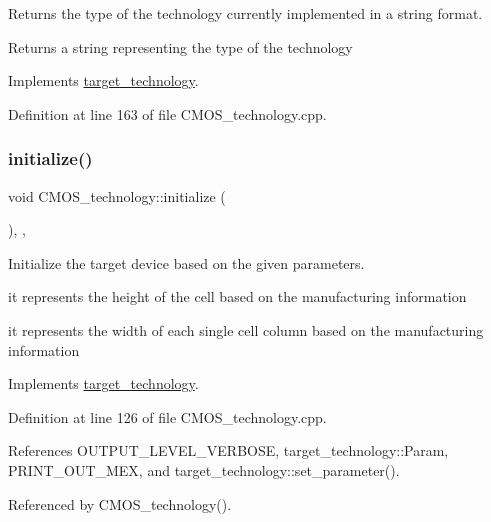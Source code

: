 Returns the type of the technology currently implemented in a string format. 

\begin{DoxyReturn}{Returns}
a string representing the type of the technology 
\end{DoxyReturn}


Implements \hyperlink{classtarget__technology_a53355954503841a8ead7a8dc9889af85}{target\+\_\+technology}.



Definition at line 163 of file C\+M\+O\+S\+\_\+technology.\+cpp.

\mbox{\label{classCMOS__technology_af6aed0f6dc8bf72c8914a14c00b949a7}} 
\subsubsection{\texorpdfstring{initialize()}{initialize()}}
{\footnotesize\ttfamily void C\+M\+O\+S\+\_\+technology\+::initialize (\begin{DoxyParamCaption}{ }\end{DoxyParamCaption})\hspace{0.3cm}{\ttfamily [override]}, {\ttfamily [private]}, {\ttfamily [virtual]}}



Initialize the target device based on the given parameters. 

it represents the height of the cell based on the manufacturing information

it represents the width of each single cell column based on the manufacturing information 

Implements \hyperlink{classtarget__technology_a1fc1fd2d6ccfa9e748f54a4aeac33b51}{target\+\_\+technology}.



Definition at line 126 of file C\+M\+O\+S\+\_\+technology.\+cpp.



References O\+U\+T\+P\+U\+T\+\_\+\+L\+E\+V\+E\+L\+\_\+\+V\+E\+R\+B\+O\+SE, target\+\_\+technology\+::\+Param, P\+R\+I\+N\+T\+\_\+\+O\+U\+T\+\_\+\+M\+EX, and target\+\_\+technology\+::set\+\_\+parameter().



Referenced by C\+M\+O\+S\+\_\+technology().

